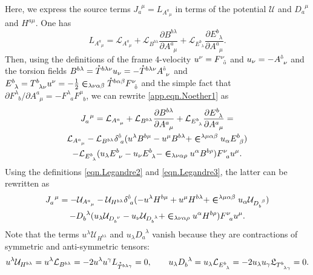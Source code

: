 \documentclass[
10pt, %
a4paper, %
oneside, %
headinclude,footinclude, %
BCOR5mm, %
]{scrartcl}
\newcommand{\itetr}[2]{F^{#1}_{\phantom{#1}#2}}
\newcommand{\tetr}[2]{A^{#1}_{\phantom{#1}#2}}
\newcommand{\Tors}[2]{T^{#1}_{\phantom{a}#2}}
\newcommand{\ET}[2]{E^{#1}_{\phantom{#1}#2}}	%
\newcommand{\eT}[2]{D_{#1}^{\phantom{#1}#2}}	%
\newcommand{\BT}[2]{B^{#1#2}}	%
\newcommand{\hT}[2]{H^{#1#2}}	%
\newcommand{\Laghodge}{L}%
\newcommand{\Lagtors}{\mathfrak{L}}%
\newcommand{\LagBE}{\mathcal{L}}%
\newcommand{\LagST}{\mathcal{U}}%
\newcommand{\LCsymb}{\bm{\in}}    %
\newcommand{\HDT}[1]{\accentset{\star}{T}^{#1}}
\newcommand{\KD}[2]{\delta^{#1}_{\,\,#2}}
\newcommand{\NC}[2]{J^{\phantom{#1}#2}_{#1}}
\newcommand{\indlat}[1]{\hat{\mathsmaller{#1}}}
\begin{document}
Here, we express the source terms $ \NC{a}{\mu} = \Laghodge_{\tetr{a}{\mu}} $ in terms of the 
potential $ \LagST $ and $ \eT{a}{\mu} $ and $ \hT{a}{\mu} $. One has
\begin{equation}\label{app.eqn.Noether1}
	\Laghodge_{\tetr{a}{\mu}} = \LagBE_{\tetr{a}{\mu}} 
	+ \LagBE_{\BT{b}{\lambda}} \frac{\partial \BT{b}{\lambda}}{\partial \tetr{a}{\mu}}
	+ \LagBE_{\ET{b}{\lambda}} \frac{\partial \ET{b}{\lambda}}{\partial \tetr{a}{\mu}}.
\end{equation}
Then, using the definitions of the frame 4-velocity $ u^\nu = \itetr{\nu}{\indlat{0}} $ and $ u_\nu 
= 
-\tetr{\indlat{0}}{\nu} $ and the torsion fields
$ \BT{b}{\lambda} = \HDT{b\lambda\nu} u_\nu = - \HDT{b\lambda\nu} \tetr{\indlat{0}}{\nu}$ and 
$ \ET{b}{\lambda} = \Tors{b}{\lambda\nu} u^\nu = 
-\frac12\LCsymb_{\lambda\nu\alpha\beta}\HDT{b\alpha\beta} \itetr{\nu}{\indlat{0}}$ and the simple 
fact 
that $ \partial\itetr{\lambda}{b}/\partial\tetr{a}{\mu} = -\itetr{\lambda}{a}\itetr{\mu}{b} $, we 
can rewrite \eqref{app.eqn.Noether1} as
\begin{multline}
	\NC{a}{\mu} = \LagBE_{\tetr{a}{\mu}} 
	+ \LagBE_{\BT{b}{\lambda}} \frac{\partial \BT{b}{\lambda}}{\partial \tetr{a}{\mu}}
	+ \LagBE_{\ET{b}{\lambda}} \frac{\partial \ET{b}{\lambda}}{\partial \tetr{a}{\mu}} = \\
	\LagBE_{\tetr{a}{\mu}} - \LagBE_{\BT{b}{\lambda}} \KD{\indlat{0}}{a}
	(u^\lambda \BT{b}{\mu} - u^\mu \BT{b}{\lambda}+\LCsymb^{\lambda\mu\alpha\beta} u_\alpha  
	\ET{b}{\beta}) \\
	-\LagBE_{\ET{b}{\lambda}} (u_\lambda \ET{b}{\nu} - u_\nu \ET{b}{\lambda} - 
	\LCsymb_{\lambda\nu\alpha\rho}u^\alpha\BT{b}{\rho})\itetr{\nu}{a}u^\mu.
\end{multline}
Using the definitions \eqref{eqn.Legandre2} and \eqref{eqn.Legandre3}, the latter can be rewritten 
as
\begin{multline}
	\NC{a}{\mu} =
	-\LagST_{\tetr{a}{\mu}} 
	- \LagST_{\hT{b}{\lambda}} \KD{\indlat{0}}{a}
	(-u^\lambda \hT{b}{\mu} + u^\mu \hT{b}{\lambda}+\LCsymb^{\lambda\mu\alpha\beta} u_\alpha 
	\LagST_{\eT{b}{\beta}}) \\
	-\eT{b}{\lambda} (u_\lambda \LagST_{\eT{b}{\nu}} - u_\nu \LagST_{\eT{b}{\lambda}} + 
	\LCsymb_{\lambda\nu\alpha\rho}u^\alpha\hT{b}{\rho})\itetr{\nu}{a}u^\mu.
\end{multline}
Note that the terms $ u^\lambda \LagST_{\hT{b}{\lambda}} $ and $ u_\lambda\eT{a}{\lambda} $ vanish 
because they are contractions of symmetric and anti-symmetric tensors: 
\begin{equation}
u^\lambda \LagST_{\hT{b}{\lambda}} = u^\lambda \LagBE_{\BT{b}{\lambda}} = -2 u^\lambda 
u^\gamma \Laghodge_{\HDT{b\lambda\gamma}} = 0, 
\qquad
u_\lambda\eT{b}{\lambda} = u_\lambda\LagBE_{\ET{b}{\lambda}} = -2 u_\lambda u_\gamma 
\Lagtors_{\Tors{b}{\lambda\gamma}} = 0.
\end{equation}
\end{document}
